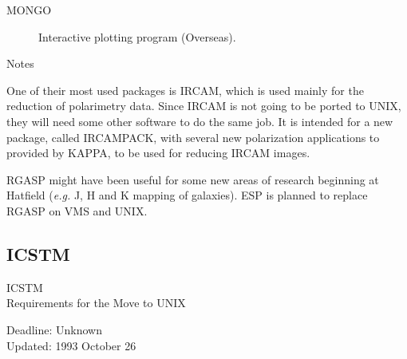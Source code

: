 \begin{description}
\item[MONGO] Interactive plotting program (Overseas).
\end{description}


\vspace{5mm}
\begin{center}
{\large\sc Notes}
\end{center}

One of their most used packages is IRCAM, which is used mainly for the
reduction of polarimetry data.
Since IRCAM is not going to be ported to UNIX, they will need some other
software to do the same job.
It is intended for a new package, called IRCAMPACK, with several new 
polarization applications to provided by KAPPA, to be used for reducing
IRCAM images.

RGASP might have been useful for some new areas of research beginning at
Hatfield ({\em e.g.} J, H and K mapping of galaxies). 
ESP is planned to replace RGASP on VMS and UNIX.


\newpage
\subsection{ICSTM}

\renewcommand{\starsitename}{ICSTM}
\renewcommand{\starnodename}{ICVAD}

\renewcommand{\starunixdate}{Unknown}
\renewcommand{\starupdate}{1993 October 26}

\renewcommand{\starsitetelephone}{071 589 5111 Ext. 6658}
\renewcommand{\starsitefax}{071 589 9463}

\begin{center}
{\Large\sc \starsitename \\ [2ex]
           Requirements for the Move to UNIX}

\vspace{3mm}
{\large\sc Deadline: \starunixdate \\ [1ex]
           Updated: \starupdate}
\end{center}

\vspace{5mm}

